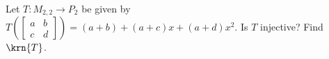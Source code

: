 Let $T : M_{2,2} \rightarrow P_2$ be given by $T\left(\begin{bmatrix} a & b \\ c & d \end{bmatrix}\right) = (a + b) + (a + c)x + (a + d)x^2$.  Is $T$ injective?  Find $\krn{T}$.

